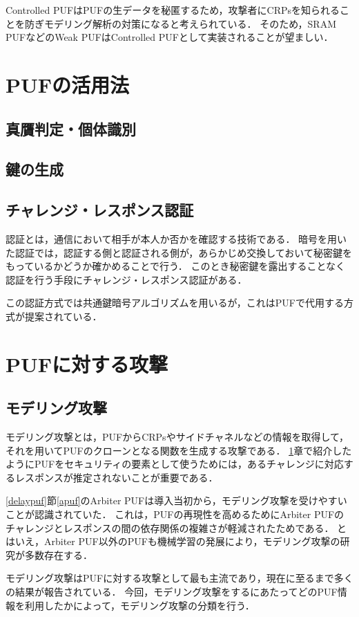 \documentclass[technicalreport]{ieicej} %
\begin{document}
Controlled PUFはPUFの生データを秘匿するため，攻撃者にCRPsを知られることを防ぎモデリング解析の対策になると考えられている．
そのため，SRAM PUFなどのWeak PUFはControlled PUFとして実装されることが望ましい．
\section{PUFの活用法}
\label{puf use}
\subsection{真贋判定・個体識別}
\subsection{鍵の生成}
\subsection{チャレンジ・レスポンス認証}
認証とは，通信において相手が本人か否かを確認する技術である．
暗号を用いた認証では，認証する側と認証される側が，あらかじめ交換しておいて秘密鍵をもっているかどうか確かめることで行う．
このとき秘密鍵を露出することなく認証を行う手段にチャレンジ・レスポンス認証がある．

この認証方式では共通鍵暗号アルゴリズムを用いるが，これはPUFで代用する方式が提案されている．
\section{PUFに対する攻撃}
\subsection{モデリング攻撃}
モデリング攻撃とは，PUFからCRPsやサイドチャネルなどの情報を取得して，それを用いてPUFのクローンとなる関数を生成する攻撃である．
\ref{puf use}章で紹介したようにPUFをセキュリティの要素として使うためには，あるチャレンジに対応するレスポンスが推定されないことが重要である．

\ref{delaypuf}節\ref{apuf}のArbiter PUFは導入当初から，モデリング攻撃を受けやすいことが認識されていた\cite{maes1}\cite{lim}．
これは，PUFの再現性を高めるためにArbiter PUFのチャレンジとレスポンスの間の依存関係の複雑さが軽減されたためである．
とはいえ，Arbiter PUF以外のPUFも機械学習の発展により，モデリング攻撃の研究が多数存在する．

モデリング攻撃はPUFに対する攻撃として最も主流であり，現在に至るまで多くの結果が報告されている．
今回，モデリング攻撃をするにあたってどのPUF情報を利用したかによって，モデリング攻撃の分類を行う．
\end{document}
